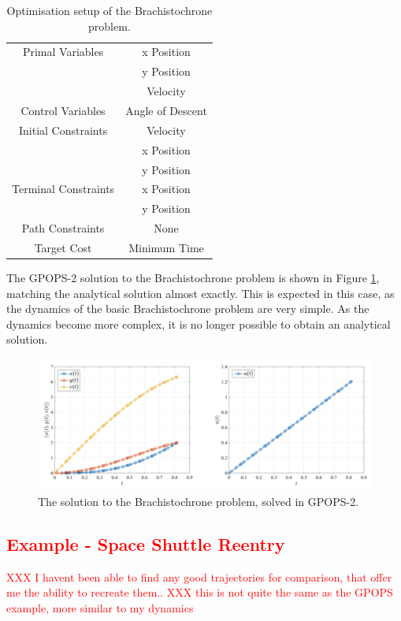\begin{table}
	\centering
	\begin{tabular}{|c|c|}
		\hline Primal Variables  & x Position\\& y Position\\& Velocity\\ 
		\hline Control Variables  & Angle of Descent\\ 
		\hline Initial Constraints  & Velocity\\ & x Position\\ & y Position\\
		\hline Terminal Constraints &  x Position\\ & y Position\\
		\hline Path Constraints & None \\ 
		\hline Target Cost & Minimum Time \\ 
		\hline 
	\end{tabular} 
	\caption{Optimisation setup of the Brachistochrone problem. }
	\label{tab:brachistochrone}
\end{table}


The GPOPS-2 solution to the Brachistochrone problem is shown in Figure \ref{fig:Brachistochrone}, matching the analytical solution almost exactly. This is expected in this case, as the dynamics of the basic Brachistochrone problem are very simple. As the dynamics become more complex, it is no longer possible to obtain an analytical solution.  

\begin{figure}[ht]
	\centering
	\includegraphics[width=0.9\linewidth]{figures/4_LODESTAR/Brachistochrone}
	\caption{The solution to the Brachistochrone problem, solved in GPOPS-2\cite{Rao2010}.}
	\label{fig:Brachistochrone}
\end{figure}




\textcolor{red}{\section{Example - Space Shuttle Reentry}}
\textcolor{red}{XXX I havent been able to find any good trajectories for comparison, that offer me the ability to recreate them..}
\textcolor{red}{XXX this is not quite the same as the GPOPS example, more similar to my dynamics}

